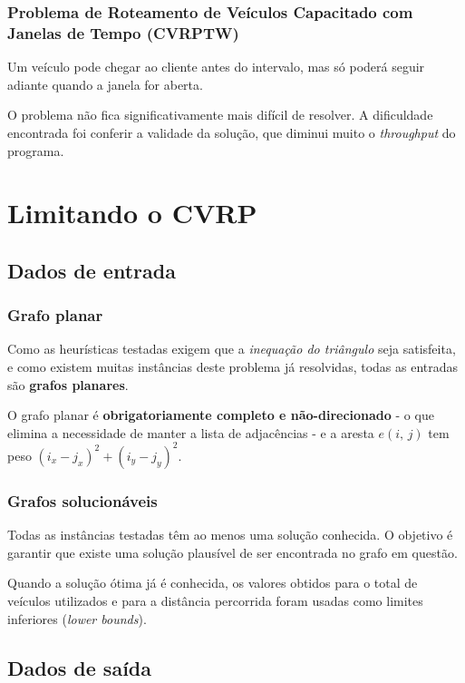 \documentclass{beamer}
\begin{document}
\begin{frame} %
    \frametitle{Problema de Roteamento de Veículos Capacitado com Janelas de Tempo (CVRPTW)}

    Um veículo pode chegar ao cliente antes do intervalo, mas só poderá seguir adiante quando a janela for aberta.

    \medskip
    O problema não fica significativamente mais difícil de resolver. A dificuldade encontrada foi conferir a validade da solução, que diminui muito o \emph{throughput} do programa.

\end{frame}


\section{Limitando o CVRP}

\subsection{Dados de entrada}

\begin{frame} %
    \frametitle{Grafo planar}

    Como as heurísticas testadas exigem que a \emph{inequação do triângulo} seja satisfeita, e como existem muitas instâncias deste problema já resolvidas, todas as entradas são \textbf{grafos planares}.

    \bigskip
    O grafo planar é \textbf{obrigatoriamente completo e não-direcionado} - o que elimina a necessidade de manter a lista de adjacências - e a aresta \(e(i, \, j)\) tem peso \((i_{x} - j_{x})^{2} + (i_{y} - j_{y})^{2}\).

\end{frame}


\begin{frame} %
    \frametitle{Grafos solucionáveis}

    Todas as instâncias testadas têm ao menos uma solução conhecida. O objetivo é garantir que existe uma solução plausível de ser encontrada no grafo em questão.

    \bigskip
    Quando a solução ótima já é conhecida, os valores obtidos para o total de veículos utilizados e para a distância percorrida foram usadas como limites inferiores (\emph{lower bounds}).

\end{frame}

\subsection{Dados de saída}
\end{document}
